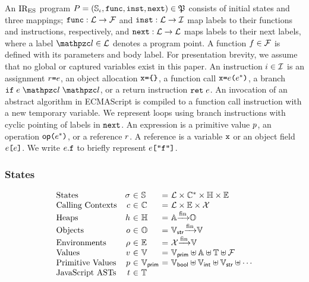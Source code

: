 An $\text{IR}_\text{ES}$ program $P = (\mathbb{S}_\iota, \texttt{func}, \texttt{inst}, \texttt{next}) \in \mathfrak{P} $
consists of initial states and three mappings; $\texttt{func}: \mathcal{L} \rightarrow
\mathcal{F}$ and $\texttt{inst}: \mathcal{L} \rightarrow \mathcal{I}$ map labels to their
functions and instructions, respectively, and $\texttt{next}: \mathcal{L} \rightarrow
\mathcal{L}$ maps labels to their next labels, where a label $\lab \in \labset$
denotes a program point.  A function $f \in \mathcal{F}$ is defined with its
parameters and body label.  For presentation brevity, we assume that no global
or captured variables exist in this paper.  An instruction $i \in \mathcal{I}$
is an assignment $r \texttt{=} e$, an object allocation $\texttt{x} \texttt{=} \texttt{\{} \texttt{\}}$, a
function call $\texttt{x} \texttt{=} e \texttt{(} e^* \texttt{)}$, a branch $\kwif \; \expr \;
\lab \; \lab$, or a return instruction $\texttt{ret} \; e$.  An invocation of an
abstract algorithm in ECMAScript is compiled to a function call instruction with
a new temporary variable.  We represent loops using branch instructions with
cyclic pointing of labels in $\texttt{next}$.  An expression is a primitive value
$p$, an operation $\textsf{op} \texttt{(} e^* \texttt{)}$, or a reference $r$.  A
reference is a variable $\texttt{x}$ or an object field $e \texttt{[} e \texttt{]}$.
We write $e.\texttt{f}$ to briefly represent $e \texttt{[} \texttt{"f"} \texttt{]}$.


\subsubsection{States}

\[
  \begin{array}{lr@{~}c@{~}l@{~}c@{~}l}
    \text{States} & \st &\in& \stset &=&
    \labset \times \ctxtset^* \times \heapset \times \envset\\

    \text{Calling Contexts} & \ctxt &\in& \ctxtset &=&
    \labset \times \envset \times \varset\\

    \text{Heaps} & \heap &\in& \heapset &=&
    \addrset \finmap \objset\\

    \text{Objects} & \obj &\in& \objset &=&
    \strset \finmap \valset\\

    \text{Environments} & \env &\in& \envset &=&
    \varset \finmap \valset\\

    \text{Values} & \val &\in& \valset &=&
    \pvalset \uplus \addrset \uplus \treeset \uplus \funcset\\

    \text{Primitive Values} & \pval &\in& \pvalset &=&
    \boolset \uplus \intset \uplus \strset \uplus \cdots\\

    \text{JavaScript ASTs} & \tree &\in& \treeset\\
  \end{array}
\]

